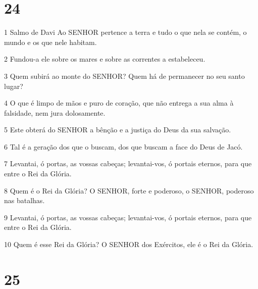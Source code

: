 \chapter{24}

\par 1 Salmo de Davi Ao SENHOR pertence a terra e tudo o que nela se contém, o mundo e os que nele habitam.
\par 2 Fundou-a ele sobre os mares e sobre as correntes a estabeleceu.
\par 3 Quem subirá ao monte do SENHOR? Quem há de permanecer no seu santo lugar?
\par 4 O que é limpo de mãos e puro de coração, que não entrega a sua alma à falsidade, nem jura dolosamente.
\par 5 Este obterá do SENHOR a bênção e a justiça do Deus da sua salvação.
\par 6 Tal é a geração dos que o buscam, dos que buscam a face do Deus de Jacó.
\par 7 Levantai, ó portas, as vossas cabeças; levantai-vos, ó portais eternos, para que entre o Rei da Glória.
\par 8 Quem é o Rei da Glória? O SENHOR, forte e poderoso, o SENHOR, poderoso nas batalhas.
\par 9 Levantai, ó portas, as vossas cabeças; levantai-vos, ó portais eternos, para que entre o Rei da Glória.
\par 10 Quem é esse Rei da Glória? O SENHOR dos Exércitos, ele é o Rei da Glória.

\chapter{25}

